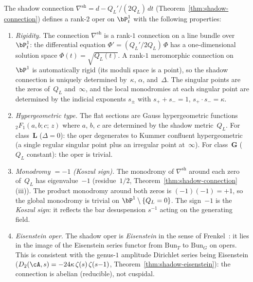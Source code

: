 \begin{proposition}
\label{prop:shadow-oper-rigid}
The shadow connection
$\nabla^{\mathrm{sh}} = d - Q_L'/(2Q_L)\,dt$
\textup{(}Theorem~\textup{\ref{thm:shadow-connection})}
defines a rank-$2$ oper on $\bP^1_t$ with the following
properties:
\begin{enumerate}[label=\textup{(\roman*)}]
\item \emph{Rigidity.}\enspace
 The connection $\nabla^{\mathrm{sh}}$ is a rank-$1$
 connection on a line bundle over~$\bP^1_t$: the
 differential equation $\Phi' = (Q_L'/2Q_L)\,\Phi$ has
 a one-dimensional solution space $\Phi(t) = \sqrt{Q_L(t)}$.
 A rank-$1$ meromorphic connection on~$\bP^1$ is
 automatically rigid (its moduli space is a point), so
 the shadow connection is uniquely determined by~$\kappa$,
 $\alpha$, and~$\Delta$.
 The singular points are the zeros of~$Q_L$
 and~$\infty$, and the local monodromies at each singular
 point are determined by the indicial exponents $s_\pm$
 with $s_+ + s_- = 1$, $s_+ \cdot s_- = \kappa$.
\item \emph{Hypergeometric type.}\enspace
 The flat sections are Gauss hypergeometric functions
 ${}_2F_1(a,b;c;\,z)$ where $a$, $b$, $c$ are determined
 by the shadow metric~$Q_L$. For class~$\mathbf{L}$
 ($\Delta = 0$): the oper degenerates to Kummer
 confluent hypergeometric (a single regular singular point
 plus an irregular point at~$\infty$). For
 class~$\mathbf{G}$ ($Q_L$ constant): the oper is trivial.
\item \emph{Monodromy $= -1$ \textup{(}Koszul sign\textup{)}.}\enspace
 The monodromy of $\nabla^{\mathrm{sh}}$ around each zero
 of~$Q_L$ has eigenvalue~$-1$
 \textup{(}residue~$1/2$,
 Theorem~\textup{\ref{thm:shadow-connection}(iii))}.
 The product monodromy around both zeros is
 $(-1)(-1) = +1$, so the global monodromy is trivial
 on $\bP^1 \setminus \{Q_L = 0\}$.
 The sign~$-1$ is the \emph{Koszul sign}: it reflects
 the bar desuspension $s^{-1}$ acting on the generating
 field.
\item \emph{Eisenstein oper.}\enspace
 The shadow oper is \emph{Eisenstein} in the sense
 of Frenkel~\textup{\cite{Frenkel05}}: it lies in the
 image of the Eisenstein series functor from
 $\mathrm{Bun}_T$ to $\mathrm{Bun}_G$ on opers.
 This is consistent with the genus-$1$ amplitude
 Dirichlet series being Eisenstein
 \textup{(}$D_2(\cA,s)
 = -24\kappa\,\zeta(s)\,\zeta(s{-}1)$,
 Theorem~\textup{\ref{thm:shadow-eisenstein}}\textup{)}:
 the connection is abelian (reducible), not cuspidal.
\end{enumerate}
\end{proposition}

